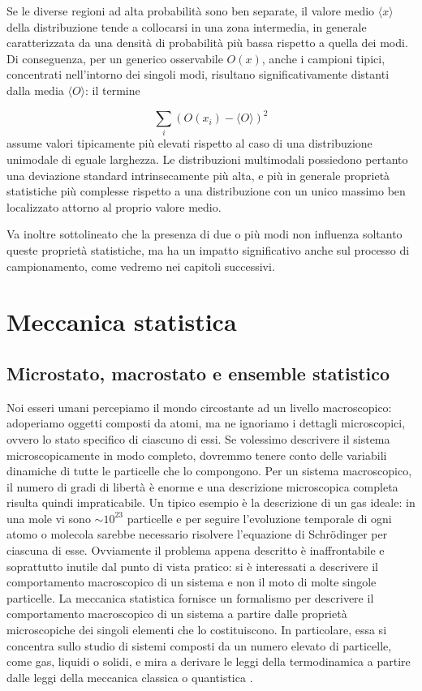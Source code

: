 Se le diverse regioni ad alta probabilità sono ben separate, il valore medio $\langle x \rangle$ della distribuzione tende a collocarsi in una zona intermedia, in generale caratterizzata da una densità di probabilità più bassa rispetto a quella dei modi. Di conseguenza, per un generico osservabile $O(x)$, anche i campioni tipici, concentrati nell'intorno dei singoli modi, risultano significativamente distanti dalla media $\langle O \rangle$: il termine

\begin{equation}
    \sum_i \left( O(x_i) - \langle O \rangle \right)^2
\end{equation} assume valori tipicamente più elevati rispetto al caso di una distribuzione unimodale di eguale larghezza. Le distribuzioni multimodali possiedono pertanto una deviazione standard intrinsecamente più alta, e più in generale proprietà statistiche più complesse rispetto a una distribuzione con un unico massimo ben localizzato attorno al proprio valore medio.

Va inoltre sottolineato che la presenza di due o più modi non influenza soltanto queste proprietà statistiche, ma ha un impatto significativo anche sul processo di campionamento, come vedremo nei capitoli successivi.

\section{Meccanica statistica}
\label{sec:meccanica-statistica}

\subsection{Microstato, macrostato e ensemble statistico}
Noi esseri umani percepiamo il mondo circostante ad un livello macroscopico: adoperiamo oggetti composti da atomi, ma ne ignoriamo i dettagli microscopici, ovvero lo stato specifico di ciascuno di essi. Se volessimo descrivere il sistema microscopicamente in modo completo, dovremmo tenere conto delle variabili dinamiche di tutte le particelle che lo compongono. Per un sistema macroscopico, il numero di gradi di libertà è enorme e una descrizione microscopica completa risulta quindi impraticabile. Un tipico esempio è la descrizione di un gas ideale: in una mole vi sono $\sim 10^{23}$ particelle e per seguire l'evoluzione temporale di ogni atomo o molecola sarebbe necessario risolvere l'equazione di Schrödinger per ciascuna di esse. Ovviamente il problema appena descritto è inaffrontabile e soprattutto inutile dal punto di vista pratico: si è interessati a descrivere il comportamento macroscopico di un sistema e non il moto di molte singole particelle.
La meccanica statistica fornisce un formalismo per descrivere il comportamento macroscopico di un sistema a partire dalle proprietà microscopiche dei singoli elementi che lo costituiscono. In particolare, essa si concentra sullo studio di sistemi composti da un numero elevato di particelle, come gas, liquidi o solidi, e mira a derivare le leggi della termodinamica a partire dalle leggi della meccanica classica o quantistica \cite{kennett2020essential}.

